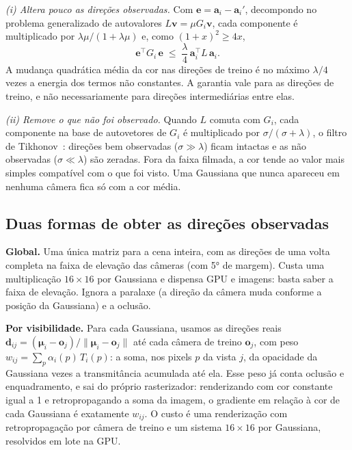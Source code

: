 \documentclass[conference]{IEEEtran}
\begin{document}
\textit{(i) Altera pouco as direções observadas.} Com $\mathbf{e} = \mathbf{a}_i - \mathbf{a}_i'$, decompondo no problema generalizado de autovalores $L\mathbf{v}=\mu G_i \mathbf{v}$, cada componente é multiplicado por $\lambda\mu/(1+\lambda\mu)$ e, como $(1+x)^2 \ge 4x$,
\begin{equation}
\mathbf{e}^\top G_i\, \mathbf{e} \;\le\; \frac{\lambda}{4}\, \mathbf{a}_i^\top L\, \mathbf{a}_i .
\end{equation}
A mudança quadrática média da cor nas direções de treino é no máximo $\lambda/4$ vezes a energia dos termos não constantes. A garantia vale para as direções de treino, e não necessariamente para direções intermediárias entre elas.

\textit{(ii) Remove o que não foi observado.} Quando $L$ comuta com $G_i$, cada componente na base de autovetores de $G_i$ é multiplicado por $\sigma/(\sigma+\lambda)$, o filtro de Tikhonov~\cite{tikhonov1963}: direções bem observadas ($\sigma \gg \lambda$) ficam intactas e as não observadas ($\sigma \ll \lambda$) são zeradas. Fora da faixa filmada, a cor tende ao valor mais simples compatível com o que foi visto. Uma Gaussiana que nunca apareceu em nenhuma câmera fica só com a cor média.

\subsection{Duas formas de obter as direções observadas}

\textbf{Global.} Uma única matriz para a cena inteira, com as direções de uma volta completa na faixa de elevação das câmeras (com 5° de margem). Custa uma multiplicação $16\times16$ por Gaussiana e dispensa GPU e imagens: basta saber a faixa de elevação. Ignora a paralaxe (a direção da câmera muda conforme a posição da Gaussiana) e a oclusão.

\textbf{Por visibilidade.} Para cada Gaussiana, usamos as direções reais $\mathbf{d}_{ij} = (\boldsymbol{\mu}_i - \mathbf{o}_j)/\lVert\boldsymbol{\mu}_i - \mathbf{o}_j\rVert$ até cada câmera de treino $\mathbf{o}_j$, com peso $w_{ij} = \sum_{p} \alpha_i(p)\, T_i(p)$: a soma, nos pixels $p$ da vista $j$, da opacidade da Gaussiana vezes a transmitância acumulada até ela. Esse peso já conta oclusão e enquadramento, e sai do próprio rasterizador: renderizando com cor constante igual a 1 e retropropagando a soma da imagem, o gradiente em relação à cor de cada Gaussiana é exatamente $w_{ij}$. O custo é uma renderização com retropropagação por câmera de treino e um sistema $16\times16$ por Gaussiana, resolvidos em lote na GPU.
\end{document}
